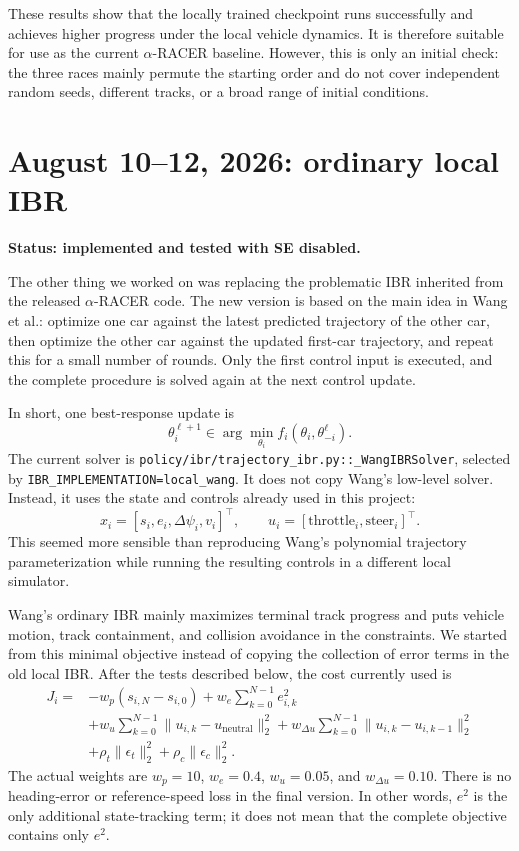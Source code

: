 \documentclass[11pt]{article}
\newcommand{\code}[1]{\texttt{#1}}
\newcommand{\status}[1]{\textcolor{blue!65!black}{\textbf{#1}}}
\begin{document}
These results show that the locally trained checkpoint runs successfully and
achieves higher progress under the local vehicle dynamics. It is therefore
suitable for use as the current $\alpha$-RACER baseline. However, this is only
an initial check: the three races mainly permute the starting order and do not cover independent random seeds, different tracks, or a broad range of initial conditions.

\section{August 10--12, 2026: ordinary local IBR}

\status{Status: implemented and tested with SE disabled.}

The other thing we worked on was replacing the problematic IBR inherited from
the released $\alpha$-RACER code. The new version is based on the main idea in
Wang et al.: optimize one car against the latest predicted trajectory of the
other car, then optimize the other car against the updated first-car
trajectory, and repeat this for a small number of rounds. Only the first
control input is executed, and the complete procedure is solved again at the
next control update.

In short, one best-response update is
\[
  \theta_i^{\ell+1}
  \in\arg\min_{\theta_i} f_i(\theta_i,\theta_{-i}^{\ell}).
\]
The current solver is \code{policy/ibr/trajectory\_ibr.py::\_WangIBRSolver}, selected by
\code{IBR\_IMPLEMENTATION=local\_wang}. It does not copy Wang's low-level
solver. Instead, it uses the state and controls already used in this project:
\[
  x_i=[s_i,e_i,\Delta\psi_i,v_i]^\top,
  \qquad
  u_i=[\text{throttle}_i,\text{steer}_i]^\top.
\]
This seemed more sensible than reproducing Wang's polynomial trajectory
parameterization while running the resulting controls in a different local
simulator.

Wang's ordinary IBR mainly maximizes terminal track progress and puts vehicle
motion, track containment, and collision avoidance in the constraints. We
started from this minimal objective instead of copying the collection of error
terms in the old local IBR. After the tests described below, the cost currently
used is
\[
\begin{aligned}
J_i={}&-w_p(s_{i,N}-s_{i,0})
  +w_e\sum_{k=0}^{N-1}e_{i,k}^2\\
&+w_u\sum_{k=0}^{N-1}\|u_{i,k}-u_{\mathrm{neutral}}\|_2^2
  +w_{\Delta u}\sum_{k=0}^{N-1}\|u_{i,k}-u_{i,k-1}\|_2^2\\
&+\rho_t\|\epsilon_t\|_2^2
  +\rho_c\|\epsilon_c\|_2^2.
\end{aligned}
\]
The actual weights are $w_p=10$, $w_e=0.4$, $w_u=0.05$, and
$w_{\Delta u}=0.10$. There is no heading-error or reference-speed loss in the
final version. In other words, $e^2$ is the only additional state-tracking
term; it does not mean that the complete objective contains only $e^2$.
\end{document}
